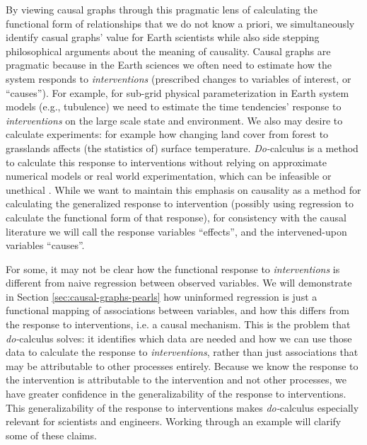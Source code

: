 \documentclass[12pt]{article}
\begin{document}
By viewing causal graphs through this pragmatic lens of calculating
the functional form of relationships that we do not know a priori, we
simultaneously identify casual graphs' value for Earth scientists
while also side stepping philosophical arguments about the meaning of
causality. Causal graphs are pragmatic because in the Earth sciences
we often need to estimate how the system responds to
\emph{interventions} (prescribed changes to variables of interest, or
``causes''). For example, for sub-grid physical parameterization in
Earth system models (e.g., tubulence) we need to estimate the time
tendencies' response to \emph{interventions} on the large scale state
and environment. We also may desire to calculate experiments: for
example how changing land cover from forest to grasslands affects (the
statistics of) surface temperature. \textit{Do-}calculus is a method
to calculate this response to interventions without relying on
approximate numerical models or real world experimentation, which can
be infeasible or unethical \citep[as is the case for geoengineering;
e.g., unilateral decisions to seed the oceans with iron, or spray
aerosols in the atmosphere,][]{hamilton2013no}. While we want to
maintain this emphasis on causality as a method for calculating the
generalized response to intervention (possibly using regression to
calculate the functional form of that response), for consistency with
the causal literature we will call the response variables ``effects'',
and the intervened-upon variables ``causes''.

For some, it may not be clear how the functional response to
\emph{interventions} is different from naive regression between
observed variables. We will demonstrate in Section
\ref{sec:causal-graphs-pearls} how uninformed regression is just a
functional mapping of associations between variables, and how this
differs from the response to interventions, i.e. a causal
mechanism. This is the problem that \textit{do-}calculus solves: it
identifies which data are needed and how we can use those data to
calculate the response to \emph{interventions}, rather than just
associations that may be attributable to other processes
entirely. Because we know the response to the intervention is
attributable to the intervention and not other processes, we have
greater confidence in the generalizability of the response to
interventions.  This generalizability of the response to interventions
makes \textit{do-}calculus especially relevant for scientists and
engineers. Working through an example will clarify some of these
claims.
\end{document}
